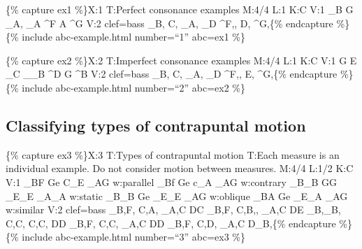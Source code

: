 \documentclass{book}
\begin{document}
\{\% capture ex1 \%\}X:1 T:Perfect consonance examples M:4/4 L:1 K:C V:1
\_B\textbar\textbar{} G\textbar\textbar{} \_A,\textbar\textbar{}
\_A\textbar\textbar{} \^{}F\textbar\textbar{} A\textbar\textbar{}
\^{}G\textbar\textbar{} V:2 clef=bass \_B,\textbar\textbar{}
C,\textbar\textbar{} \_A,\textbar\textbar{} \_D\textbar\textbar{}
\^{}F,,\textbar\textbar{} D,\textbar\textbar{} \^{}G,\textbar\textbar\{\%
endcapture \%\} \{\% include abc-example.html number=``1'' abc=ex1 \%\}

\{\% capture ex2 \%\}X:2 T:Imperfect consonance examples M:4/4 L:1 K:C V:1
G\textbar\textbar{} E\textbar\textbar{} \_C\textbar\textbar{}
\_\_B\textbar\textbar{} \^{}D\textbar\textbar{} G\textbar\textbar{}
\^{}B\textbar\textbar{} V:2 clef=bass \_B,\textbar\textbar{}
C,\textbar\textbar{} \_A,\textbar\textbar{} \_D\textbar\textbar{}
\^{}F,,\textbar\textbar{} E,\textbar\textbar{} \^{}G,\textbar\textbar\{\%
endcapture \%\} \{\% include abc-example.html number=``2'' abc=ex2 \%\}

\hypertarget{classifying-types-of-contrapuntal-motion}{%
\subsection{Classifying types of contrapuntal
motion}\label{classifying-types-of-contrapuntal-motion}}

\{\% capture ex3 \%\}X:3 T:Types of contrapuntal motion T:Each measure is an
individual example. Do not consider motion between measures. M:4/4 L:1/2 K:C
V:1 \_BF\textbar\textbar{} Ge\textbar\textbar{} C\_E\textbar\textbar{}
\_AG\textbar\textbar{} w:parallel \_Bf\textbar\textbar{} Ge\textbar\textbar{}
c\_A\textbar\textbar{} \_AG\textbar\textbar{} w:contrary
\_B\_B\textbar\textbar{} GG\textbar\textbar{} \_E\_E\textbar\textbar{}
\_A\_A\textbar\textbar{} w:static \_B\_B\textbar\textbar{}
Ge\textbar\textbar{} \_E\_E\textbar\textbar{} \_AG\textbar\textbar{} w:oblique
\_BA\textbar\textbar{} Ge\textbar\textbar{} \_E\_A\textbar\textbar{}
\_AG\textbar\textbar{} w:similar V:2 clef=bass \_B,F,\textbar\textbar{}
C,A,\textbar\textbar{} \_A,C\textbar\textbar{} DC\textbar\textbar{}
\_B,F,\textbar\textbar{} C,B,,\textbar\textbar{} \_A,C\textbar\textbar{}
DE\textbar\textbar{} \_B,\_B,\textbar\textbar{} C,C,\textbar\textbar{}
C,C,\textbar\textbar{} DD\textbar\textbar{} \_B,F,\textbar\textbar{}
C,C,\textbar\textbar{} \_A,C\textbar\textbar{} DD\textbar\textbar{}
\_B,F,\textbar\textbar{} C,D,\textbar\textbar{} \_A,C\textbar\textbar{}
D\_B,\textbar\textbar\{\% endcapture \%\} \{\% include abc-example.html
number=``3'' abc=ex3 \%\}
\end{document}
